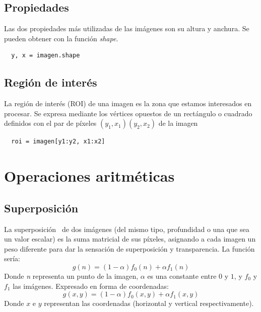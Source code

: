 \subsection{Propiedades}
Las dos propiedades más utilizadas de las imágenes son su altura y
anchura.  Se pueden obtener con la función \emph{shape}.
\begin{verbatim}
  y, x = imagen.shape
\end{verbatim}

\subsection{Región de interés}\label{tecnica:roi}
La región de interés (ROI) de una imagen es la zona que estamos
interesados en procesar. Se expresa mediante los vértices opuestos de
un rectángulo o cuadrado definidos con el par de píxeles
$\left(y_1,x_1\right)\left(y_2,x_2\right)$ de la imagen
\begin{verbatim}
  roi = imagen[y1:y2, x1:x2]
\end{verbatim}

\section{Operaciones aritméticas}
\subsection{Superposición}
La superposición\emph{~\citep[3.1.1 Pixel transforms, 3.1.3
  Compositing and matting]{szeliski2010computer}} de dos imágenes (del
mismo tipo, profundidad o una que sea un valor escalar) es la suma
matricial de sus píxeles, asignando a cada imagen un peso diferente
para dar la sensación de superposición y transparencia. La función
sería:
\begin{equation*}
  g(n) = (1 - \alpha)f_0(n) + \alpha f_1(n)
\end{equation*}
Donde \emph{n} representa un punto de la imagen, \emph{$\alpha$} es
una constante entre $0$ y $1$, y \emph{$f_0$} y \emph{$f_1$} las
imágenes.  Expresado en forma de coordenadas:
\begin{equation*}
  g(x, y) = (1 - \alpha)f_0(x, y) + \alpha f_1(x, y)
\end{equation*}
Donde $x$ e $y$ representan las coordenadas (horizontal y vertical
respectivamente).


